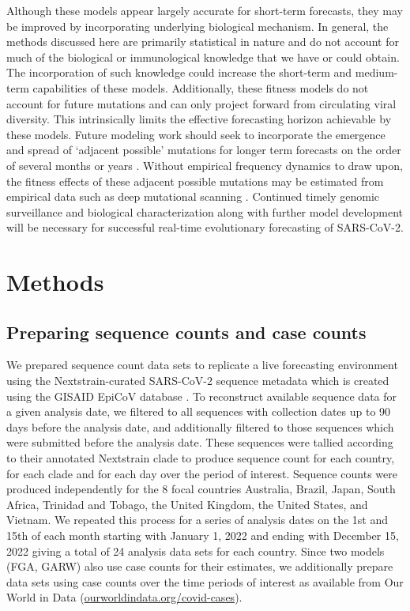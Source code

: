 Although these models appear largely accurate for short-term forecasts, they may be improved by incorporating underlying biological mechanism.
In general, the methods discussed here are primarily statistical in nature and do not account for much of the biological or immunological knowledge that we have or could obtain.
The incorporation of such knowledge could increase the short-term and medium-term capabilities of these models.
Additionally, these fitness models do not account for future mutations and can only project forward from circulating viral diversity.
This intrinsically limits the effective forecasting horizon achievable by these models.
Future modeling work should seek to incorporate the emergence and spread of `adjacent possible' mutations for longer term forecasts on the order of several months or years \cite{kauffman1993origins}.
Without empirical frequency dynamics to draw upon, the fitness effects of these adjacent possible mutations may be estimated from empirical data such as deep mutational scanning \cite{cao2022ba, greaney2022antibody, dadonaite2023full}.
Continued timely genomic surveillance and biological characterization along with further model development will be necessary for successful real-time evolutionary forecasting of SARS-CoV-2.

\section*{Methods}

\subsection*{Preparing sequence counts and case counts}

We prepared sequence count data sets to replicate a live forecasting environment using the Nextstrain-curated SARS-CoV-2 sequence metadata \cite{Hadfield2018} which is created using the GISAID EpiCoV database \cite{khare2021gisaid}.
To reconstruct available sequence data for a given analysis date, we filtered to all sequences with collection dates up to 90 days before the analysis date, and additionally filtered to those sequences which were submitted before the analysis date.
These sequences were tallied according to their annotated Nextstrain clade to produce sequence count for each country, for each clade and for each day over the period of interest.
Sequence counts were produced independently for the 8 focal countries Australia, Brazil, Japan, South Africa, Trinidad and Tobago, the United Kingdom, the United States, and Vietnam.
We repeated this process for a series of analysis dates on the 1st and 15th of each month starting with January 1, 2022 and ending with December 15, 2022 giving a total of 24 analysis data sets for each country.
Since two models (FGA, GARW) also use case counts for their estimates, we additionally prepare data sets using case counts over the time periods of interest as available from Our World in Data (\href{https://ourworldindata.org/covid-cases}{ourworldindata.org/covid-cases}).

